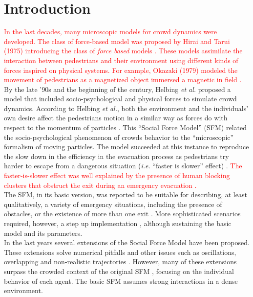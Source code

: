 \documentclass[preprint,12pt]{elsarticle}
\begin{document}

\section{\label{introduction}Introduction}

\textcolor{red}{In the last decades, many microscopic models 
for crowd dynamics were developed. The class of force-based model was proposed by Hirai 
and Tarui (1975) introducing the class of \textit{force based} models 
\cite{Hirai}. These models assimilate the interaction between 
pedestrians and their environment using different kinds of forces inspired on physical systems. For 
example, Okazaki (1979) modeled the movement of pedestrians as 
a magnetized object immersed a magnetic in field \cite{Okazaki}.}\\

By the late '90s and the beginning of the century, Helbing 
\textit{et al.} proposed a model that included socio-psychological and physical 
forces to simulate crowd dynamics. According to Helbing \textit{et al.}, both 
the environment and the individuals' own desire affect the pedestrians motion in 
a similar way as forces do with respect to the momentum of particles 
\cite{Helbing1,Helbing4}. This ``Social Force Model'' (SFM) related the 
socio-psychological phenomenon of crowds behavior to the ``microscopic'' 
formalism of moving particles. The model succeeded at this instance to 
reproduce the slow down in the efficiency in the evacuation process as 
pedestrians try harder to escape from a dangerous situation (\textit{i.e.} 
``faster is slower'' effect) \cite{Helbing1,Dorso2}.
\textcolor{red}{The faster-is-slower effect was well explained by the presence of human blocking clusters 
that obstruct the exit during an emergency evacuation \cite{Dorso1}.}  \\ 

The SFM, in its basic version, was reported to be suitable for describing, 
at least qualitatively, a variety of emergency situations, including the presence
of obstacles, or the existence of more than one exit \cite{Dorso3,Dorso5}.
More sophisticated scenarios required, however, a step up implementation
\cite{Cornes1,Dorso4,Dorso6}, although sustaining the basic model and its parameters.  \\

In the last years several extensions of the Social Force Model have been 
proposed. These extensions solve numerical pitfalls \cite{koster1} 
and other issues such as oscillations, overlapping and non-realistic trajectories
\cite{chraibi1,dietrich1}. However, many of these extensions surpass the 
crowded context of the original SFM \cite{Helbing1,Helbing4}, focusing on the 
individual behavior of each agent. The basic SFM assumes strong interactions
in a dense environment.\\
\end{document}
